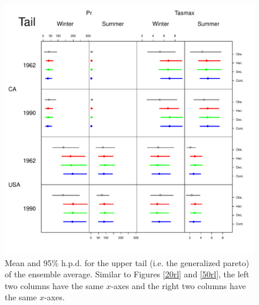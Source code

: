\documentclass[12pt]{article}
\begin{document}
\begin{figure}
\begin{center}
\includegraphics[scale=0.72]{figs/tail.pdf}
\end{center}
\caption{Mean and 95\% h.p.d. for the upper tail (i.e. the generalized pareto) of the ensemble average. Similar to Figures \ref{20rl} and \ref{50rl}, the left two columns have the same $x$-axes and the right two columns have the same $x$-axes.}
\label{tail}
\end{figure}
\end{document}
